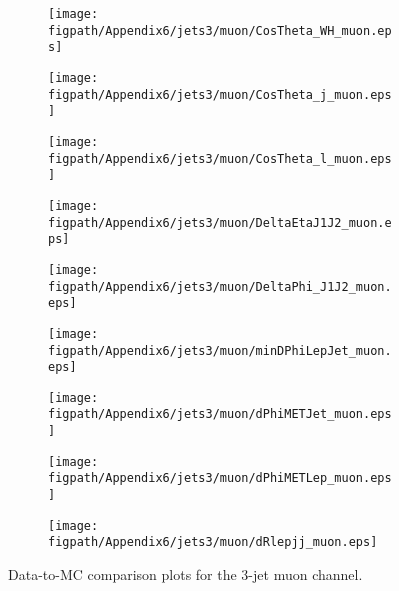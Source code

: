 \begin{figure}[!hbtp]
    \centering
    \begin{subfigure}[t]{0.317\textwidth}
        \texttt{[image: \\figpath/Appendix6/jets3/muon/CosTheta\_WH\_muon.eps]}
    \end{subfigure}
    \begin{subfigure}[t]{0.317\textwidth}
        \texttt{[image: \\figpath/Appendix6/jets3/muon/CosTheta\_j\_muon.eps]}
    \end{subfigure}
    \begin{subfigure}[t]{0.317\textwidth}
        \texttt{[image: \\figpath/Appendix6/jets3/muon/CosTheta\_l\_muon.eps]}
    \end{subfigure}

    \begin{subfigure}[t]{0.317\textwidth}
        \texttt{[image: \\figpath/Appendix6/jets3/muon/DeltaEtaJ1J2\_muon.eps]}
    \end{subfigure}
    \begin{subfigure}[t]{0.317\textwidth}
        \texttt{[image: \\figpath/Appendix6/jets3/muon/DeltaPhi\_J1J2\_muon.eps]}
    \end{subfigure}
    \begin{subfigure}[t]{0.317\textwidth}
        \texttt{[image: \\figpath/Appendix6/jets3/muon/minDPhiLepJet\_muon.eps]}
    \end{subfigure}

    \begin{subfigure}[t]{0.317\textwidth}
        \texttt{[image: \\figpath/Appendix6/jets3/muon/dPhiMETJet\_muon.eps]}
    \end{subfigure}
    \begin{subfigure}[t]{0.317\textwidth}
        \texttt{[image: \\figpath/Appendix6/jets3/muon/dPhiMETLep\_muon.eps]}
    \end{subfigure}
    \begin{subfigure}[t]{0.317\textwidth}
        \texttt{[image: \\figpath/Appendix6/jets3/muon/dRlepjj\_muon.eps]}
    \end{subfigure}
    \caption{Data-to-MC comparison plots for the 3-jet muon channel.}
    \label{fig:comparison_plots_jets3_muon_1}
\end{figure}

